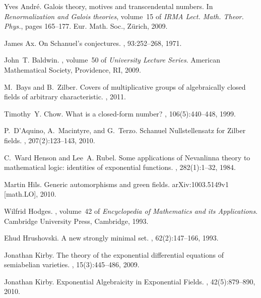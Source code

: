 \documentclass[12pt]{amsart}
\theoremstyle{definition}
\begin{document}
\begin{thebibliography}{10}

Yves Andr{\'e}.
\newblock Galois theory, motives and transcendental numbers.
\newblock In {\em Renormalization and {G}alois theories}, volume~15 of {\em
  IRMA Lect. Math. Theor. Phys.}, pages 165--177. Eur. Math. Soc., Z\"urich,
  2009.

James Ax.
\newblock On {S}chanuel's conjectures.
, 93:252--268, 1971.

John~T. Baldwin.
, volume~50 of {\em University Lecture Series}.
\newblock American Mathematical Society, Providence, RI, 2009.

M.~Bays and B.~Zilber.
\newblock Covers of multiplicative groups of algebraically closed fields of
  arbitrary characteristic.
, 2011.

Timothy~Y. Chow.
\newblock What is a closed-form number?
, 106(5):440--448, 1999.

P.~D'Aquino, A.~Macintyre, and G.~Terzo.
\newblock Schanuel {N}ullstellensatz for {Z}ilber fields.
, 207(2):123--143, 2010.

C.~Ward Henson and Lee~A. Rubel.
\newblock Some applications of {N}evanlinna theory to mathematical logic:
  identities of exponential functions.
, 282(1):1--32, 1984.

Martin Hils.
\newblock Generic automorphisms and green fields.
\newblock arXiv:1003.5149v1 [math.LO], 2010.

Wilfrid Hodges.
, volume~42 of {\em Encyclopedia of Mathematics and
  its Applications}.
\newblock Cambridge University Press, Cambridge, 1993.

Ehud Hrushovski.
\newblock A new strongly minimal set.
, 62(2):147--166, 1993.

Jonathan Kirby.
\newblock The theory of the exponential differential equations of semiabelian
  varieties.
, 15(3):445--486, 2009.

Jonathan Kirby.
\newblock Exponential {A}lgebraicity in {E}xponential {F}ields.
, 42(5):879--890, 2010.


\end{thebibliography}
\end{document}

